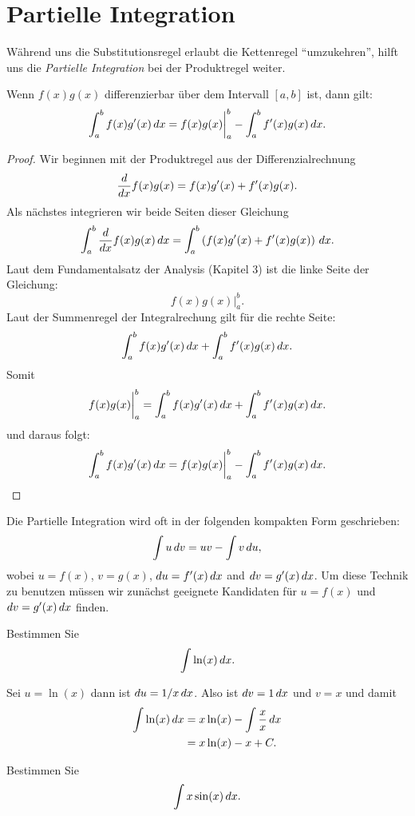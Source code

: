 \section{Partielle Integration}

Während uns die Substitutionsregel erlaubt die Kettenregel ``umzukehren'', hilft uns die \textit{Partielle Integration} bei der Produktregel weiter.

\begin{mainTheorem} 
Wenn $f(x)g(x)$ differenzierbar über dem Intervall $[a,b]$ ist, dann gilt:
\[
\int_a^b f(x) g'(x) \, d x =f(x)g(x) \bigg|_a^b - \int_a^b f'(x) g(x) \, d x.
\]
\end{mainTheorem}
\begin{proof} Wir beginnen mit der Produktregel aus der Differenzialrechnung
\[
\frac{d}{dx} f(x)g(x) = f(x)g'(x) + f'(x) g(x).
\]
Als nächstes integrieren wir beide Seiten dieser Gleichung
\[
\int_a^b \frac{d}{dx} f(x) g(x) \, d x = \int_a^b \left(f(x)g'(x) + f'(x) g(x)\right) \, d x.
\]
Laut dem Fundamentalsatz der Analysis (Kapitel 3) ist die linke Seite der Gleichung:
\[
f(x)g(x) \bigg|_a^b.
\]
Laut der Summenregel der Integralrechung gilt für die rechte Seite:
\[
\int_a^b f(x)g'(x)\, d x + \int_a^b f'(x) g(x) \, d x.
\]
Somit
\[
f(x)g(x) \bigg|_a^b = \int_a^b f(x)g'(x)\, d x + \int_a^b f'(x) g(x) \, d x.
\]
und daraus folgt: 
\[
 \int_a^b f(x)g'(x)\, d x = f(x)g(x) \bigg|_a^b -  \int_a^b f'(x) g(x) \, d x.
\]
\end{proof}

Die Partielle Integration wird oft in der folgenden kompakten Form geschrieben:
\[
\int u\, d v = uv-\int v\, d u,
\]
wobei $u=f(x)$, $v=g(x)$, $du=f'(x)\, d x$ and $dv=g'(x)\, d x$.  Um diese Technik zu benutzen müssen wir zunächst geeignete Kandidaten für $u=f(x)$ und
$dv=g'(x)\, d x$ finden.



\begin{example}
Bestimmen Sie
\[
\int \ln(x)\, d x.
\]
\end{example}

\begin{solution}
Sei $u=\ln(x)$ dann ist $du=1/x\, d x$. Also ist $dv=1\, d x$ und $v=x$
und damit
\begin{align*}
 \int \ln(x)\, d x&=x\ln (x)-\int \frac{x}{x}\, d x\\
&= x\ln (x)- x+C.\\
\end{align*}
\end{solution}

\begin{example}
Bestimmen Sie
\[
\int x\sin(x) \, d x.
\]
\end{example}

